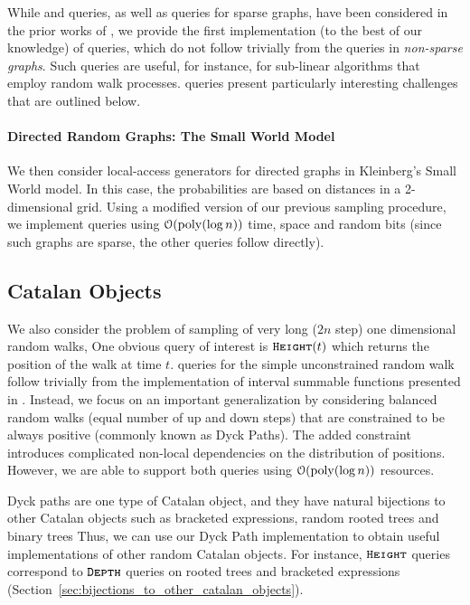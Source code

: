 While  and  queries, as well as  queries for sparse graphs,
have been considered in the prior works of \cite{reut, huge_old, huge, sparse}, we provide the first implementation (to the best of our knowledge)
of  queries, which do not follow trivially from the  queries in \emph{non-sparse graphs}.
Such queries are useful, for instance, for sub-linear algorithms that employ random walk processes.
 queries present particularly interesting challenges that are outlined below.


\paragraph*{Directed Random Graphs: The Small World Model}
\label{par:directed_random_graphs}
We then consider local-access generators for directed graphs in Kleinberg's Small World model.
In this case, the probabilities are based on distances in a 2-dimensional grid.
Using a modified version of our previous sampling procedure, we implement  queries using
$\mathcal{O}(\mathrm{poly}(\log n))$ time, space and random bits (since such graphs are sparse, the other queries follow directly).




\subsection{Catalan Objects}%
\label{sec:intro_catalan_objects}
We also consider the problem of sampling of very long ($2n$ step) one dimensional random walks,
One obvious query of interest is $\texttt{\textsc{Height}}(t)$ which returns the position of the walk at time $t$.
 queries for the simple unconstrained random walk
follow trivially from the implementation of interval summable functions presented in \cite{huge}.
Instead, we focus on an important generalization by considering balanced random walks (equal number of up and down steps)
that are constrained to be always positive (commonly known as Dyck Paths).
The added constraint introduces complicated non-local dependencies on the distribution of positions.
However, we are able to support both queries using $\mathcal O(\mathrm{poly}(\log n))$ resources.

Dyck paths are one type of Catalan object, and they have natural bijections to other Catalan objects
such as bracketed expressions, random rooted trees and binary trees
Thus, we can use our Dyck Path implementation to obtain useful implementations of other random Catalan objects.
For instance, $\texttt{\textsc{Height}}$ queries correspond to $\texttt{\textsc{Depth}}$ queries on rooted trees and bracketed expressions
(Section~\ref{sec:bijections_to_other_catalan_objects}).

